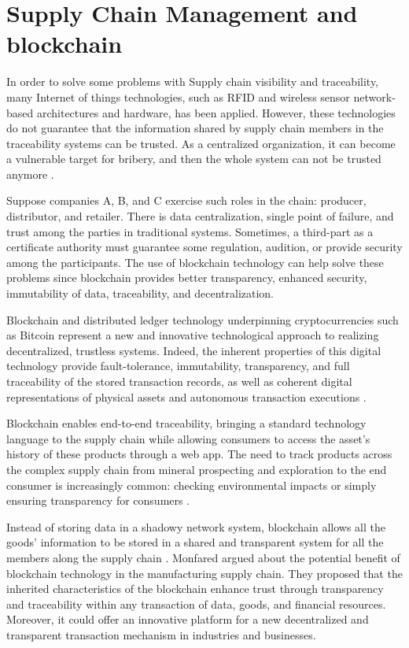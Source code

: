 \section{Supply Chain Management and blockchain}\label{sec:scmBlock}

In order to solve some problems with Supply chain visibility and traceability, many Internet of things technologies, such as RFID and wireless sensor network-based architectures and hardware, has been applied. However, these technologies do not guarantee that the information shared by supply chain members in the traceability systems can be trusted. As a centralized organization, it can become a vulnerable target for bribery, and then the whole system can not be trusted anymore \cite{tian2017supply}.

Suppose companies A, B, and C exercise such roles in the chain: producer, distributor, and retailer. There is data centralization, single point of failure, and trust among the parties in traditional systems. Sometimes, a third-part as a certificate authority must guarantee some regulation, audition, or provide security among the participants. The use of blockchain technology can help solve these problems since blockchain provides better transparency, enhanced security, immutability of data, traceability, and decentralization.

Blockchain and distributed ledger technology underpinning cryptocurrencies such as Bitcoin represent a new and innovative technological approach to realizing decentralized, trustless systems. Indeed, the inherent properties of this digital technology provide fault-tolerance, immutability, transparency, and full traceability of the stored transaction records, as well as coherent digital representations of physical assets and autonomous transaction executions \cite{caro2018blockchain}.

Blockchain enables end-to-end traceability, bringing a standard technology language to the supply chain while allowing consumers to access the asset's history of these products through a web app. The need to track products across the complex supply chain from mineral prospecting and exploration to the end consumer is increasingly common: checking environmental impacts or simply ensuring transparency for consumers \cite{galvez2018future}.

Instead of storing data in a shadowy network system, blockchain allows all the goods' information to be stored in a shared and transparent system for all the members along the supply chain \cite{tian2017supply}. Monfared \cite{abeyratne2016blockchain} argued about the potential benefit of blockchain technology in the manufacturing supply chain. They proposed that the inherited characteristics of the blockchain enhance trust through transparency and traceability within any transaction of data, goods, and financial resources. Moreover, it could offer an innovative platform for a new decentralized and transparent transaction mechanism in industries and businesses.

